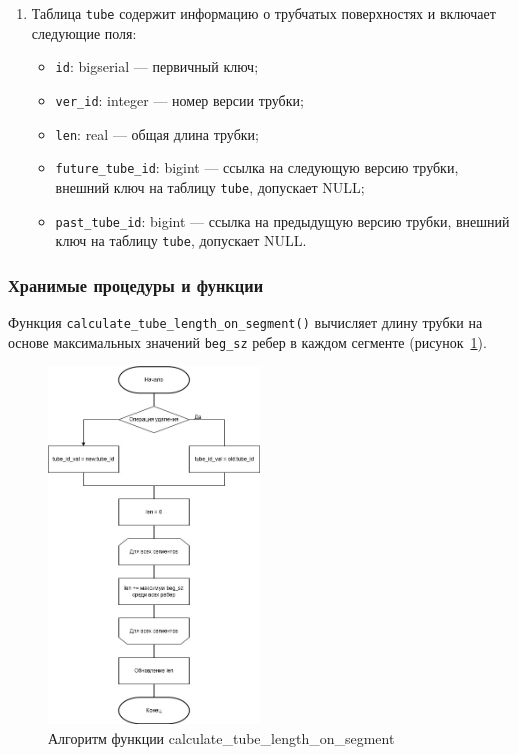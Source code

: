 \begin{enumerate}
    \item Таблица \texttt{tube} содержит информацию о трубчатых поверхностях и включает следующие поля:
        \begin{itemize}[leftmargin=\parindent]
            \item \texttt{id}: bigserial --- первичный ключ;
            \item \texttt{ver\_id}: integer --- номер версии трубки;
            \item \texttt{len}: real --- общая длина трубки;
            \item \texttt{future\_tube\_id}: bigint --- ссылка на следующую версию трубки, внешний ключ на таблицу \texttt{tube}, допускает NULL;
            \item \texttt{past\_tube\_id}: bigint --- ссылка на предыдущую версию трубки, внешний ключ на таблицу \texttt{tube}, допускает NULL.
        \end{itemize}
\end{enumerate}


\subsubsection{Хранимые процедуры и функции}

Функция \texttt{calculate\_tube\_length\_on\_segment()} вычисляет длину трубки на основе максимальных значений \texttt{beg\_sz} ребер в каждом сегменте (рисунок~\ref{fig:calculatetubelengthonsegment}).

\begin{figure}[H]
\centering
\includegraphics[width=0.5\textwidth]{img/calculate_tube_length_on_segment.jpg}
\caption{Алгоритм функции calculate\_tube\_length\_on\_segment}
\label{fig:calculatetubelengthonsegment}
\end{figure}

